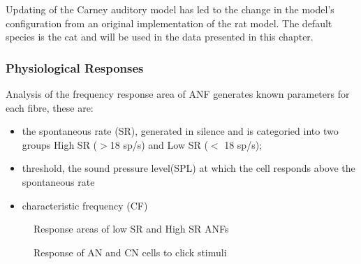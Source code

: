\medskip{}

 Updating of the Carney auditory model has led to the
change in the model's configuration from an original implementation of
the rat model.  The default species is the cat and will be used in the
data presented in this chapter.

\subsubsection{Physiological Responses}

Analysis of the frequency response area of ANF generates known
parameters for each fibre, these are:
\begin{itemize}
\item the spontaneous rate (SR), generated in silence and is
  categoried into two groups High SR ($>$18 sp/s) and Low SR ($<$ 18
  sp/s);
\item threshold, the sound pressure level(SPL) at which the cell
  responds above the spontaneous rate
\item characteristic frequency (CF)
\end{itemize}

\begin{figure}[tbp]
  \begin{center}
    \caption{Response areas of low SR and High SR ANFs }
    \label{fig:CochlearTTCs}
  \end{center}
\end{figure}


\begin{figure}[tbh]
  \begin{center}
    \caption{Response of AN and CN cells to click stimuli }
    \label{fig:ClickDelayAN}
  \end{center}
\end{figure}


